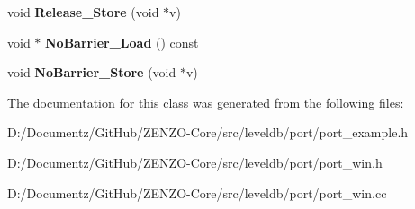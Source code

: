 \begin{DoxyCompactItemize}
\mbox{\label{classleveldb_1_1port_1_1_atomic_pointer_a8dfe51c125f71c09a363dae042be63a7}} 
void {\bfseries Release\+\_\+\+Store} (void $\ast$v)
\item 
\mbox{\label{classleveldb_1_1port_1_1_atomic_pointer_a615de2ac1a6d373986639f662a8bc2bd}} 
void $\ast$ {\bfseries No\+Barrier\+\_\+\+Load} () const
\item 
\mbox{\label{classleveldb_1_1port_1_1_atomic_pointer_aa7faab23777d1fe3c1a96d32a28ed20c}} 
void {\bfseries No\+Barrier\+\_\+\+Store} (void $\ast$v)
\end{DoxyCompactItemize}


The documentation for this class was generated from the following files\+:\begin{DoxyCompactItemize}
\item 
D\+:/\+Documentz/\+Git\+Hub/\+Z\+E\+N\+Z\+O-\/\+Core/src/leveldb/port/port\+\_\+example.\+h\item 
D\+:/\+Documentz/\+Git\+Hub/\+Z\+E\+N\+Z\+O-\/\+Core/src/leveldb/port/port\+\_\+win.\+h\item 
D\+:/\+Documentz/\+Git\+Hub/\+Z\+E\+N\+Z\+O-\/\+Core/src/leveldb/port/port\+\_\+win.\+cc\end{DoxyCompactItemize}
